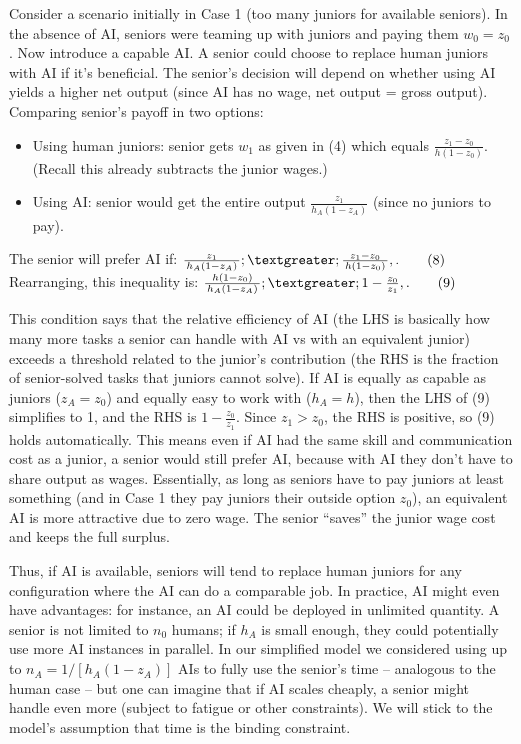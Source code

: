\documentclass[12pt]{article}
\begin{document}
Consider a scenario initially in Case 1 (too many juniors for available
seniors). In the {absence of AI}, seniors were teaming up with
juniors and paying them \(w_0 = z_0\). Now introduce a capable AI. A
senior could choose to {replace human juniors with AI} if it's
beneficial. The senior's decision will depend on whether using AI yields
a higher net output (since AI has no wage, net output = gross output).
Comparing senior's payoff in two options:

\begin{itemize}

\item
  Using human juniors: senior gets \(w_1\) as given in (4) which equals
  \(\frac{z_1 - z_0}{h(1-z_0)}\). (Recall this already subtracts the
  junior wages.)
\item
  Using AI: senior would get the entire output
  \(\frac{z_1}{h_A(1-z_A)}\) (since no juniors to pay).
\end{itemize}

The senior will prefer AI if: $ \frac{z_1}{\,h_A(1-z_A)\,}
;\textgreater; \frac{z_1 - z_0}{\,h(1-z_0)\,},. \tag{8}$ Rearranging,
this inequality is: $ \frac{h(1-z_0)}{\,h_A(1-z_A)\,} ;\textgreater; 1
- \frac{z_0}{z_1},. \tag{9}$

This condition says that the {relative efficiency} of AI (the LHS
is basically how many more tasks a senior can handle with AI vs with an
equivalent junior) exceeds a threshold related to the junior's
contribution (the RHS is the fraction of senior-solved tasks that
juniors cannot solve). If AI is equally as capable as juniors
(\(z_A = z_0\)) and equally easy to work with (\(h_A = h\)), then the
LHS of (9) simplifies to 1, and the RHS is \(1 - \frac{z_0}{z_1}\).
Since \(z_1 > z_0\), the RHS is positive, so (9) holds automatically.
This means {even if AI had the same skill and communication cost as
a junior, a senior would still prefer AI}, because with AI they don't
have to share output as wages. Essentially, as long as seniors have to
pay juniors at least something (and in Case 1 they pay juniors their
outside option \(z_0\)), an equivalent AI is more attractive due to zero
wage. The senior ``saves'' the junior wage cost and keeps the full
surplus.

Thus, {if AI is available, seniors will tend to replace human
juniors} for any configuration where the AI can do a comparable job. In
practice, AI might even have advantages: for instance, an AI could be
deployed in {unlimited quantity}. A senior is not limited to
\(n_0\) humans; if \(h_A\) is small enough, they could potentially use
more AI instances in parallel. In our simplified model we considered
using up to \(n_A = 1/[h_A(1-z_A)]\) AIs to fully use the senior's time
-- analogous to the human case -- but one can imagine that if AI scales
cheaply, a senior might handle even more (subject to fatigue or other
constraints). We will stick to the model's assumption that time is the
binding constraint.
\end{document}
